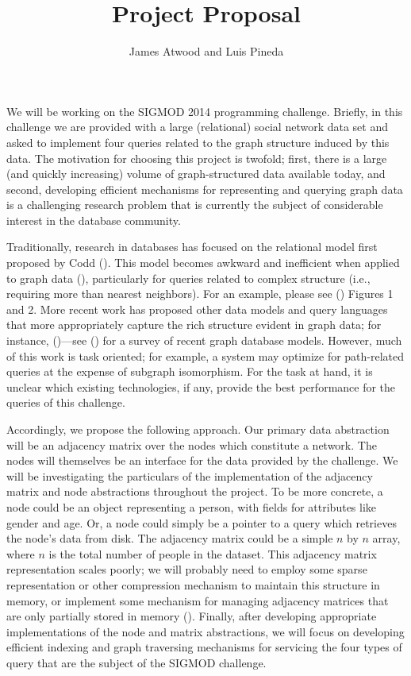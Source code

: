 \documentclass{article}
\title{Project Proposal}
\author{
James Atwood and Luis Pineda \\ %
}
\begin{document}
\maketitle

We will be working on the SIGMOD 2014 programming challenge.  Briefly, in this challenge we are provided with a large (relational) social network data set and asked to implement four queries related to the graph structure induced by this data.  The motivation for choosing this project is twofold; first, there is a large (and quickly increasing) volume of graph-structured data available today, and second, developing efficient mechanisms for representing and querying graph data is a challenging research problem that is currently the subject of considerable interest in the database community.

Traditionally, research in databases has focused on the relational model first proposed by Codd  (\cite{codd1970relational}).  This model becomes awkward and inefficient when applied to graph data (\cite{rodriguez2011graph}), particularly for queries related to complex structure (i.e., requiring more than nearest neighbors).  For an example, please see (\cite{he2008graphs}) Figures 1 and 2.  More recent work has proposed other data models and query languages that more appropriately capture the rich structure evident in graph data; for instance, (\cite{he2008graphs,sun2012efficient,low2010graphlab})---see (\cite{angles2008survey}) for a survey of recent graph database models.  However, much of this work is task oriented; for example, a system may optimize for path-related queries at the expense of subgraph isomorphism.  For the task at hand, it is unclear which existing technologies, if any, provide the best performance for the queries of this challenge.

Accordingly, we propose the following approach.  Our primary data abstraction will be an adjacency matrix over the nodes which constitute a network.  The nodes will themselves be an interface for the data provided by the challenge.  We will be investigating the particulars of the implementation of the adjacency matrix and node abstractions throughout the project. To be more concrete, a node could be an object representing a person, with fields for attributes like gender and age.  Or, a node could simply be a pointer to a query which retrieves the node's data from disk.  The adjacency matrix could be a simple $n$ by $n$ array, where $n$ is the total number of people in the dataset.  This adjacency matrix representation scales poorly; we will probably need to employ some sparse representation or other compression mechanism to maintain this structure in memory, or implement some mechanism for managing adjacency matrices that are only partially stored in memory (\cite{wang2004scalable}). Finally, after developing appropriate  implementations of the node and matrix abstractions, we will focus on developing efficient indexing and graph traversing mechanisms for servicing the four types of query that are the subject of the SIGMOD challenge.
\end{document}
